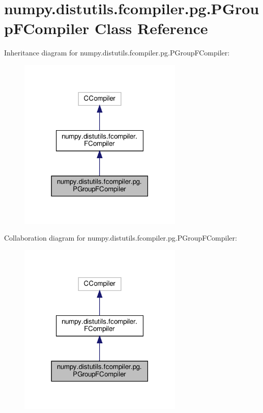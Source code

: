 \hypertarget{classnumpy_1_1distutils_1_1fcompiler_1_1pg_1_1PGroupFCompiler}{}\section{numpy.\+distutils.\+fcompiler.\+pg.\+P\+Group\+F\+Compiler Class Reference}
\label{classnumpy_1_1distutils_1_1fcompiler_1_1pg_1_1PGroupFCompiler}


Inheritance diagram for numpy.\+distutils.\+fcompiler.\+pg.\+P\+Group\+F\+Compiler\+:
\nopagebreak
\begin{figure}[H]
\begin{center}
\leavevmode
\includegraphics[width=222pt]{classnumpy_1_1distutils_1_1fcompiler_1_1pg_1_1PGroupFCompiler__inherit__graph}
\end{center}
\end{figure}


Collaboration diagram for numpy.\+distutils.\+fcompiler.\+pg.\+P\+Group\+F\+Compiler\+:
\nopagebreak
\begin{figure}[H]
\begin{center}
\leavevmode
\includegraphics[width=222pt]{classnumpy_1_1distutils_1_1fcompiler_1_1pg_1_1PGroupFCompiler__coll__graph}
\end{center}
\end{figure}
